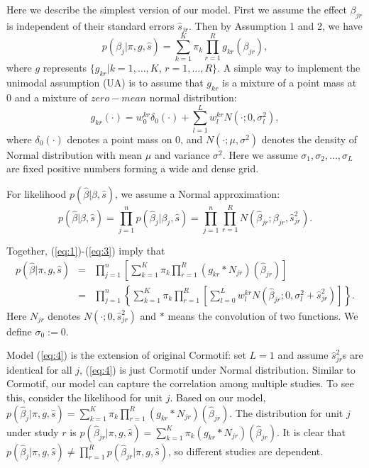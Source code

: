 \documentclass[11pt]{article}
\begin{document}
Here we describe the simplest version of our model. First we assume the effect $\beta_{jr}$ is independent of their standard errors $\hat s_{jr}$. Then by Assumption 1 and 2, we have
\begin{equation}
p(\beta_j|\pi,g,\hat s) = \sum_{k=1}^K\pi_k\prod_{r=1}^R  g_{kr}(\beta_{jr}),
\label{eq:1}
\end{equation}
where $g$ represents $\{g_{kr}|k = 1,\ldots,K$, $r=1,\ldots,R\}$. A simple way to implement the unimodal assumption (UA) is to assume that $g_{kr}$ is a mixture of a point mass at 0 and a mixture of $zero-mean$ normal distribution:
\begin{equation}
g_{kr}(\cdot) =  w_0^{kr}\delta_0(\cdot)+\sum_{l=1}^L w_l^{kr}N(\cdot;0,\sigma_l^2),
\label{eq:2}
\end{equation}
where $\delta_0(\cdot)$ denotes a point mass on 0, and $N(\cdot;\mu,\sigma^2)$ denotes the density of Normal distribution with mean $\mu$ and variance $\sigma^2$. Here we assume  $\sigma_1,\sigma_2,\ldots,\sigma_L$ are fixed positive numbers forming a wide and dense grid. 

For likelihood $p(\hat \beta|\beta,\hat s)$, we assume a Normal approximation:
\begin{equation}
p(\hat \beta|\beta,\hat s) = \prod_{j=1}^np(\hat \beta_j|\beta_j,\hat s) = \prod_{j=1}^n\prod_{r=1}^RN(\hat\beta_{jr};\beta_{jr},\hat s_{jr}^2).
\label{eq:3}
\end{equation}

Together, (\ref{eq:1})-(\ref{eq:3}) imply that 
\begin{eqnarray}
p(\hat\beta|\pi,g,\hat s) &=& \prod_{j=1}^n\left[\sum_{k=1}^K\pi_k\prod_{r=1}^R(g_{kr}*N_{jr})(\hat\beta_{jr})\right] \nonumber \\ 
&=& \prod_{j=1}^n\left\{\sum_{k=1}^K\pi_k\prod_{r=1}^R\left[ \sum_{l=0}^Lw_l^{kr}N(\hat\beta_{jr};0,\sigma_l^2+\hat s_{jr}^2)\right]\right\}.
\label{eq:4}
\end{eqnarray}
Here $N_{jr}$ denotes $N(\cdot;0,\hat s_{jr}^2)$ and $*$ means the convolution of two functions. We define $\sigma_0:=0$.

Model (\ref{eq:4}) is the extension of original Cormotif: set $L=1$ and assume $\hat s_{jr}^2$s are identical for all $j$, (\ref{eq:4}) is just Cormotif under Normal distribution. Similar to Cormotif, our model can capture the correlation among multiple studies. To see this, consider the likelihood for unit $j$. Based on our model, $p(\hat\beta_j|\pi,g,\hat s) = \sum_{k=1}^K\pi_k\prod_{r=1}^R(g_{kr}*N_{jr})(\hat\beta_{jr})$. The distribution for unit $j$ under study $r$ is $p(\hat\beta_{jr}|\pi,g,\hat s) = \sum_{k=1}^K\pi_k(g_{kr}*N_{jr})(\hat\beta_{jr})$. It is clear that $p(\hat\beta_j|\pi,g,\hat s) \neq \prod_{r=1}^Rp(\hat\beta_{jr}|\pi,g,\hat s)$, so different studies are dependent. 
\end{document}
